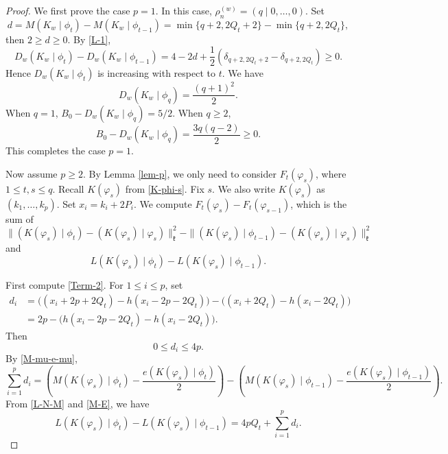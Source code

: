 \documentclass[11pt]{amsart}
\theoremstyle{plain}
\theoremstyle{definition}
\newcommand{\frk}{\mathfrak{k}}
\begin{document}
\begin{proof}
	We first prove the case $p=1$. In this case, $\rho_n^{(w)}=(q\mid 0,\dots,0)$. Set
	$$d=M(K_w\mid \phi_t)-M(K_w\mid \phi_{t-1})=\min\{q+2,2Q_t+2\}-\min\{q+2,2Q_t\},$$
	then $2\ge d\ge 0$. By \eqref{L-1},
	\[D_w(K_w\mid \phi_t)-D_w(K_w\mid \phi_{t-1})=4-2d+\dfrac{1}{2}\left(\delta_{q+2,2Q_t+2}-\delta_{q+2,2Q_t}\right)\ge 0.\]
	Hence $D_w(K_w\mid \phi_t)$ is increasing with respect to $t$. We have
	\[D_w(K_w\mid \phi_q)=\dfrac{(q+1)^2}{2}.\]
	When $q=1$, $B_0-D_w(K_w\mid \phi_q)=5/2$. When $q\ge 2$,
	\[B_0-D_w(K_w\mid \phi_q)=\dfrac{3q(q-2)}{2}\ge 0.\]
	This completes the case $p=1$.
	
	Now assume $p\ge 2$. By Lemma \ref{lem-p}, we only need to consider $F_t(\varphi_s)$, where $1\le t,s\le q$. Recall $K(\varphi_s)$ from \eqref{K-phi-s}. Fix $s$. We also write $K(\varphi_s)$ as $(k_1, \dots, k_p)$. Set $x_i=k_i+2P_i$. We compute $F_t(\varphi_s)-F_t(\varphi_{s-1})$, which is the sum of
	\begin{equation}\label{Term-1}
		\|(K(\varphi_s)\mid\phi_t) - (K(\varphi_s)\mid\varphi_s)\|_{\frk}^2 - \|(K(\varphi_s)\mid\phi_{t-1}) - (K(\varphi_s)\mid\varphi_s)\|_{\frk}^2
	\end{equation}
	and
	\begin{equation}\label{Term-2}
		L(K(\varphi_s)\mid\phi_t)- L(K(\varphi_s)\mid\phi_{t-1}).
	\end{equation}

	First compute \eqref{Term-2}. For $1\le i\le p$, set
	\begin{align*}
		d_i&=\big((x_i+2p+2Q_t)-h(x_i-2p-2Q_t)\big)-\big((x_i+2Q_t)-h(x_i-2Q_t)\big)\\
		&= 2p-\big(h(x_i-2p-2Q_t)-h(x_i-2Q_t)\big).
	\end{align*}
	Then
	\[0\le d_i\le 4p.\]
	By \eqref{M-mu-e-mu},
	\begin{equation}\label{M-E}
		\sum_{i=1}^pd_i=\left(M(K(\varphi_s)\mid \phi_t)-\dfrac{e(K(\varphi_s)\mid \phi_t)}{2}\right)-\left(M(K(\varphi_s)\mid \phi_{t-1})-\dfrac{e(K(\varphi_s)\mid \phi_{t-1})}{2}\right).
	\end{equation}
	From \eqref{L-N-M} and \eqref{M-E}, we have
	\[L(K(\varphi_s)\mid \phi_t)-L(K(\varphi_s)\mid \phi_{t-1})=4pQ_t+\sum_{i=1}^pd_i.\]
	

\end{proof}
\end{document}
